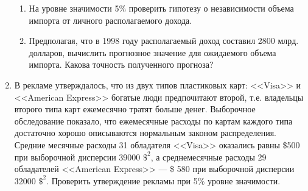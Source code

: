 \documentclass[pdftex,12pt,a4paper]{article}
\begin{document}
\begin{enumerate}
\begin{enumerate}
\item На уровне значимости 5\% проверить гипотезу о независимости объема импорта от личного располагаемого дохода.
\item Предполагая, что в 1998 году располагаемый доход составил 2800 млрд. долларов, вычислить прогнозное значение для ожидаемого объема импорта. Какова точность полученного прогноза?
\end{enumerate}
\item В рекламе утверждалось, что из двух типов пластиковых карт: <<Visa>> и <<American Express>> богатые люди предпочитают второй, т.е. владельцы второго типа карт ежемесячно тратят больше денег. Выборочное обследование показало, что ежемесячные расходы по картам каждого типа достаточно хорошо описываются нормальным законом распределения. Средние месячные расходы 31 обладателя <<Visa>> оказались равны \$500 при выборочной дисперсии 39000 $\$^2$, а среднемесячные расходы 29 обладателей <<American Express>> --- \$ 580 при выборочной дисперсии 32000 $\$^2$. Проверить утверждение рекламы при 5\% уровне значимости.
\end{enumerate} 
\end{document}
